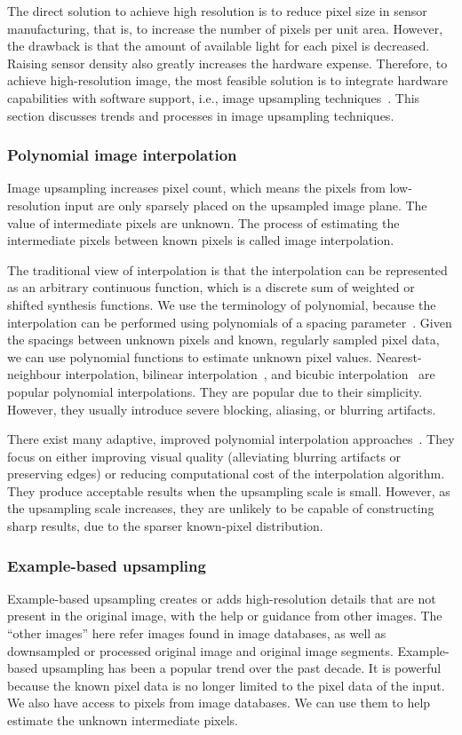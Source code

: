 The direct solution to achieve high resolution is to reduce pixel size in sensor manufacturing, that is, to increase the number of pixels per unit area. However, the drawback is that the amount of available light for each pixel is decreased. Raising sensor density also greatly increases the hardware expense. Therefore, to achieve high-resolution image, the most feasible solution is to integrate hardware capabilities with software support, i.e., image upsampling techniques~\cite{book:superRes}. This section discusses trends and processes in image upsampling techniques.

\subsubsection{Polynomial image interpolation}
Image upsampling increases pixel count, which means the pixels from low-resolution input are only sparsely placed on the upsampled image plane. The value of intermediate pixels are unknown. The process of estimating the intermediate pixels between known pixels is called image interpolation. 

The traditional view of interpolation is that the interpolation can be represented as an arbitrary continuous function, which is a discrete sum of weighted or shifted synthesis functions. We use the terminology of polynomial, because the interpolation can be performed using polynomials of a spacing parameter~\cite{book:superRes}. Given the spacings between unknown pixels and known, regularly sampled pixel data, we can use polynomial functions to estimate unknown pixel values. Nearest-neighbour interpolation, bilinear interpolation~\cite{Unser:spline}, and bicubic interpolation~\cite{bicubic} are popular polynomial interpolations. They are popular due to their simplicity. However, they usually introduce severe blocking, aliasing, or blurring artifacts. 

There exist many adaptive, improved polynomial interpolation approaches~\cite{warpeddistance,regInterpolation,adaptiveInter}. They focus on either improving visual quality (alleviating blurring artifacts or preserving edges) or reducing computational cost of the interpolation algorithm. They produce acceptable results when the upsampling scale is small. However, as the upsampling scale increases, they are unlikely to be capable of constructing sharp results, due to the sparser known-pixel distribution. 

\subsubsection{Example-based upsampling}\label{bg:examplebasedUpsampling}
Example-based upsampling creates or adds high-resolution details that are not present in the original image, with the help or guidance from other images. The ``other images'' here refer images found in image databases, as well as downsampled or processed original image and original image segments. Example-based upsampling has been a popular trend over the past decade. It is powerful because the known pixel data is no longer limited to the pixel data of the input. We also have access to pixels from image databases. We can use them to help estimate the unknown intermediate pixels. 

